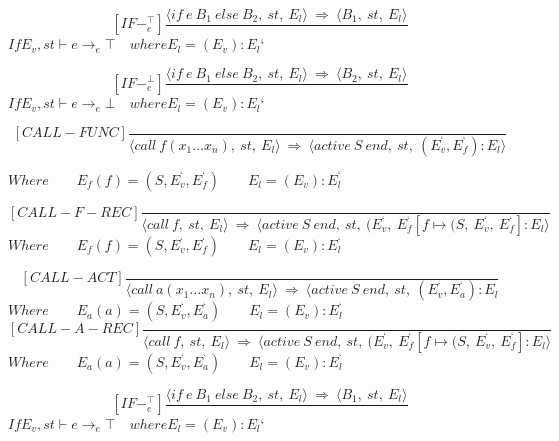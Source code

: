 	\[
	[IF-^{\top}_e]
	\dfrac{\langle if \ e \ B_1 \ else \ B_2, \ st, \ E_l \rangle \ \Rightarrow \ \langle B_1, \ st, \ E_l \rangle}{}
	\]
	\begin{math}
		If E_v, st \vdash e \rightarrow_e \top \quad where E_l = (E_v) : E_l{‘}
	\end{math}
	
	\[
	[IF-^{\bot}_e]
	\dfrac{\langle if \ e \ B_1 \ else \ B_2, \ st, \ E_l \rangle \ \Rightarrow \ \langle B_2, \ st, \ E_l \rangle}{}
	\]
	\begin{math}
		If E_v, st \vdash e \rightarrow_e \bot \quad where E_l = (E_v) : E_l{‘}
	\end{math}
	
	\[
	[CALL-FUNC]
	\dfrac{}{ \langle call \ f(x_1 … x_n), \ st, \ E_l \rangle \ \Rightarrow \ \langle active \ S \ end, \ st, \ (E_v^{‘}, E_f^{‘}) : E_l \rangle}
	\]
	
	\begin{math}
		Where 
		\qquad E_f(f) = (S, E_v^{‘}, E_f^{‘})
		\qquad E_l = (E_v) : E_l^{‘}
	\end{math}
	
	\[
	[CALL-F-REC]
	\dfrac{}{ \langle call \ f, \ st, \ E_l \rangle \ \Rightarrow \ \langle active \ S \ end, \ st, \ (E_v^{‘}, \ E_f^{‘}[f \mapsto (S, \ E_v^{‘}, \ E_f^{‘}] : E_l \rangle}
	\]
	\begin{math}
		Where
		\qquad E_f(f) = (S, E_v^{‘}, E_f^{‘}) 
		\qquad E_l = (E_v) : E_l^{‘}
	\end{math}
	
	\[
	[CALL-ACT]
	\dfrac{}{ \langle call \ a(x_1 … x_n), \ st, \ E_l \rangle \ \Rightarrow \ \langle active \ S \ end, \ st, \ (E_v^{‘}, E_a^{‘}) : E_l}
	\]
	\begin{math}
		Where
		\qquad E_a(a) = (S, E_v^{‘}, E_a^{‘})
		\qquad E_l = (E_v) : E_l^{‘}
	\end{math}
	\[
	[CALL-A-REC]
	\dfrac{}{ \langle call \ f, \ st, \ E_l \rangle \ \Rightarrow \ \langle active \ S \ end, \ st, \ (E_v^{‘}, \ E_f^{‘}[f \mapsto (S, \ E_v^{‘}, \ E_f^{‘}] : E_l \rangle}
	\]
	\begin{math}
		Where
		\qquad E_a(a) = (S, E_v^{‘}, E_a^{‘})
		\qquad E_l = (E_v) : E_l^{‘}		
	\end{math}
	
	\[
	[IF-^{\top}_e]
	\dfrac{\langle if \ e \ B_1 \ else \ B_2, \ st, \ E_l \rangle \ \Rightarrow \ \langle B_1, \ st, \ E_l \rangle}{}
	\]
	\begin{math}
		If E_v, st \vdash e \rightarrow_e \top \quad where E_l = (E_v) : E_l{‘}
	\end{math}
	
